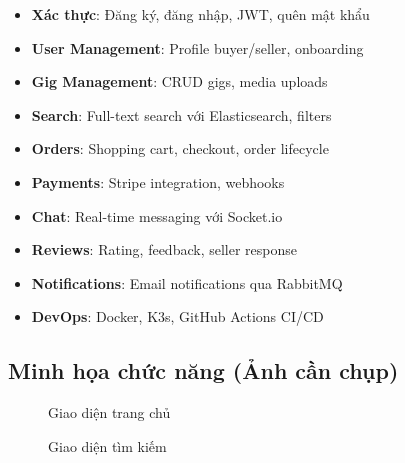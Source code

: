 \documentclass[12pt]{extreport}
\begin{document}
\begin{itemize}
    \item[\checkmark] \textbf{Xác thực}: Đăng ký, đăng nhập, JWT, quên mật khẩu
    \item[\checkmark] \textbf{User Management}: Profile buyer/seller, onboarding
    \item[\checkmark] \textbf{Gig Management}: CRUD gigs, media uploads
    \item[\checkmark] \textbf{Search}: Full-text search với Elasticsearch, filters
    \item[\checkmark] \textbf{Orders}: Shopping cart, checkout, order lifecycle
    \item[\checkmark] \textbf{Payments}: Stripe integration, webhooks
    \item[\checkmark] \textbf{Chat}: Real-time messaging với Socket.io
    \item[\checkmark] \textbf{Reviews}: Rating, feedback, seller response
    \item[\checkmark] \textbf{Notifications}: Email notifications qua RabbitMQ
    \item[\checkmark] \textbf{DevOps}: Docker, K3s, GitHub Actions CI/CD
\end{itemize}

\subsection{Minh họa chức năng (Ảnh cần chụp)}

\begin{figure}[H]
    \centering
    \caption{Giao diện trang chủ}
    \label{fig:screenshot_home}
\end{figure}

\begin{figure}[H]
    \centering
    \caption{Giao diện tìm kiếm}
    \label{fig:screenshot_search}
\end{figure}
\end{document}
